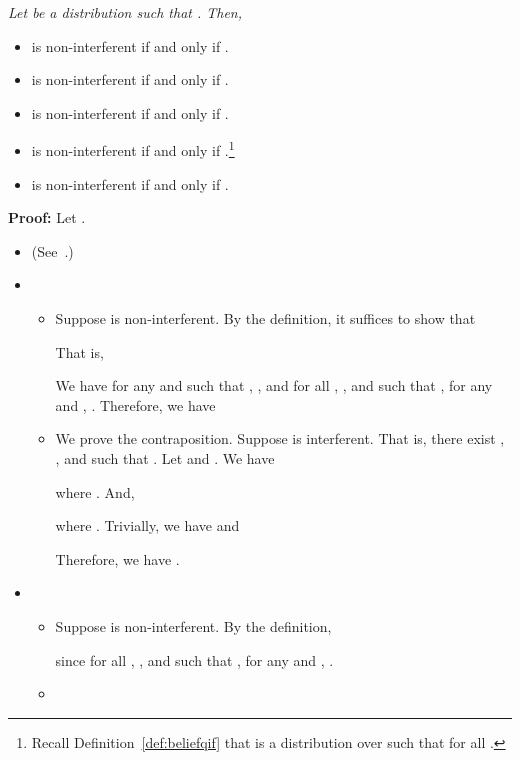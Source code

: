 \documentclass{llncs}
\newenvironment{proof}{\noindent\rm{\bf Proof:}}{\hbox{}\vspace*{0.2\baselineskip}}
\newenvironment{reftheorem}[1]{\begin{trivlist}\item[\hskip
      \labelsep{\bf Theorem #1.}]\it}{\end{trivlist}}
\begin{document}
\begin{reftheorem}{\ref{thm:nonint}}
Let  be a distribution such that .  Then,
\begin{itemize}
\item  is non-interferent if and only if .
\item  is non-interferent if and only if .
\item  is non-interferent if and only if .
\item  is non-interferent if and only if .\footnote{Recall Definition~\ref{def:beliefqif} that  is a
distribution over  such that  for all .}
\item  is non-interferent if and only if .  
\end{itemize}
\end{reftheorem}
\begin{proof}
  Let .
\begin{itemize}
\item 

\hspace{0.5em}
  (See~\cite{clark05}.)
\vspace{0.5em}

\item 
\begin{itemize}
\item 

  Suppose  is non-interferent.  By the definition, it suffices to
  show that

That is,

We have for any  and  such that ,
, and 
for all , , and  such that
, for any  and
, .
 Therefore, we
have

\item 

  We prove the contraposition.  Suppose  is interferent.  That is,
  there exist , , and  such that
  .  Let  and
  .  We have

where
.
And,

where
.   
Trivially, we have  and

Therefore, we have .
\end{itemize}

\item 
\begin{itemize}
\item 

  Suppose  is non-interferent.  By the definition,

since for all , , and  such that
, for any  and
, .
\item 


\end{itemize}
\end{itemize}
\end{proof}
\end{document}

